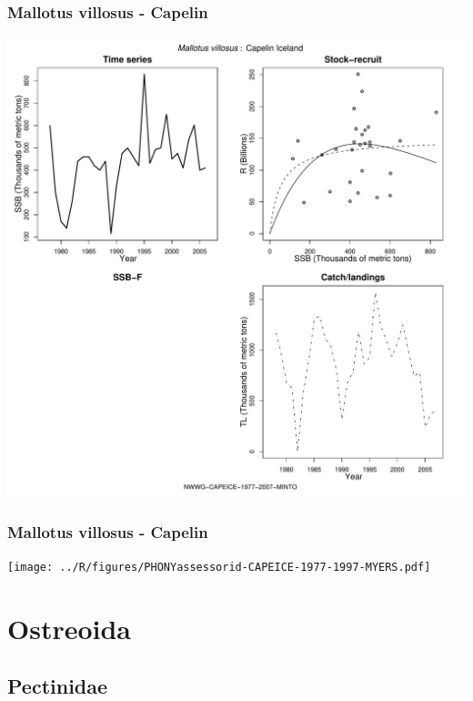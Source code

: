 \subsubsection{Mallotus villosus - Capelin}
\begin{center}
\includegraphics[width=1.2\textwidth]{../R/figures/NWWG-CAPEICE-1977-2007-MINTO.pdf}
\end{center}

\subsubsection{Mallotus villosus - Capelin}
\begin{center}
\texttt{[image: ../R/figures/PHONYassessorid-CAPEICE-1977-1997-MYERS.pdf]}
\end{center}

\section{Ostreoida}

\subsection{Pectinidae}

